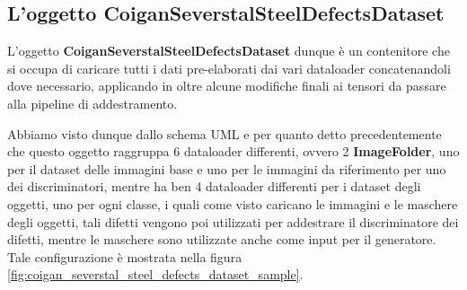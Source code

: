 \subsection{L'oggetto CoiganSeverstalSteelDefectsDataset}

L'oggetto \textbf{CoiganSeverstalSteelDefectsDataset} dunque è un contenitore che si occupa di caricare tutti i dati pre-elaborati dai
vari dataloader concatenandoli dove necessario, applicando in oltre alcune modifiche finali ai tensori da passare alla pipeline di addestramento.

Abbiamo visto dunque dallo schema UML e per quanto detto precedentemente che questo oggetto raggruppa 6 dataloader differenti, ovvero 2 \textbf{ImageFolder},
uno per il dataset delle immagini base e uno per le immagini da riferimento per uno dei discriminatori, mentre ha ben 4 dataloader differenti per i dataset degli oggetti,
uno per ogni classe, i quali come visto caricano le immagini e le maschere degli oggetti, tali difetti vengono poi utilizzati per addestrare il discriminatore dei difetti,
mentre le maschere sono utilizzate anche come input per il generatore. Tale configurazione è mostrata nella figura \ref{fig:coigan_severstal_steel_defects_dataset_sample}.

